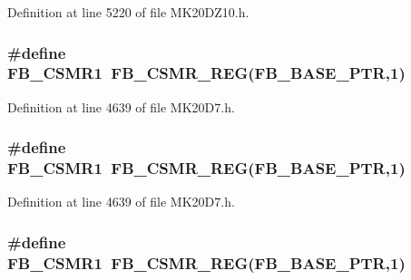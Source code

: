 Definition at line 5220 of file M\+K20\+D\+Z10.\+h.

\subsubsection[{\texorpdfstring{F\+B\+\_\+\+C\+S\+M\+R1}{FB_CSMR1}}]{\setlength{\rightskip}{0pt plus 5cm}\#define F\+B\+\_\+\+C\+S\+M\+R1~{\bf F\+B\+\_\+\+C\+S\+M\+R\+\_\+\+R\+EG}({\bf F\+B\+\_\+\+B\+A\+S\+E\+\_\+\+P\+TR},1)}\hypertarget{group___f_b___register___accessor___macros_gaf4ae8350ff50e05617a0c20a888f7d98}{}\label{group___f_b___register___accessor___macros_gaf4ae8350ff50e05617a0c20a888f7d98}


Definition at line 4639 of file M\+K20\+D7.\+h.

\subsubsection[{\texorpdfstring{F\+B\+\_\+\+C\+S\+M\+R1}{FB_CSMR1}}]{\setlength{\rightskip}{0pt plus 5cm}\#define F\+B\+\_\+\+C\+S\+M\+R1~{\bf F\+B\+\_\+\+C\+S\+M\+R\+\_\+\+R\+EG}({\bf F\+B\+\_\+\+B\+A\+S\+E\+\_\+\+P\+TR},1)}\hypertarget{group___f_b___register___accessor___macros_gaf4ae8350ff50e05617a0c20a888f7d98}{}\label{group___f_b___register___accessor___macros_gaf4ae8350ff50e05617a0c20a888f7d98}


Definition at line 4639 of file M\+K20\+D7.\+h.

\subsubsection[{\texorpdfstring{F\+B\+\_\+\+C\+S\+M\+R1}{FB_CSMR1}}]{\setlength{\rightskip}{0pt plus 5cm}\#define F\+B\+\_\+\+C\+S\+M\+R1~{\bf F\+B\+\_\+\+C\+S\+M\+R\+\_\+\+R\+EG}({\bf F\+B\+\_\+\+B\+A\+S\+E\+\_\+\+P\+TR},1)}\hypertarget{group___f_b___register___accessor___macros_gaf4ae8350ff50e05617a0c20a888f7d98}{}\label{group___f_b___register___accessor___macros_gaf4ae8350ff50e05617a0c20a888f7d98}


